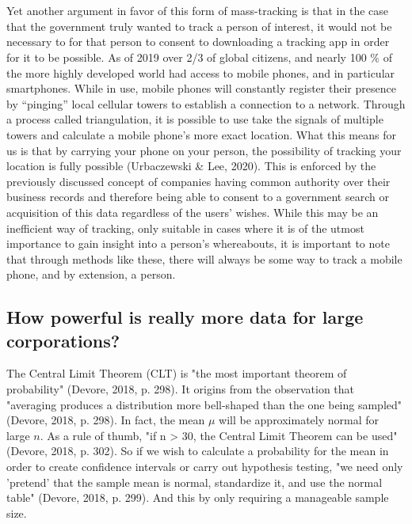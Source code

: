 \documentclass[11pt]{article}
\begin{document}
\\ \\
Yet another argument in favor of this form of mass-tracking is that in the case that the government truly wanted to track a person of interest, it would not be necessary to for that person to consent to downloading a tracking app in order for it to be possible.
As of 2019 over 2/3 of global citizens, and nearly 100 $\%$ of the more highly developed world had access to mobile phones, and in particular smartphones. While in use, mobile phones will constantly register their presence by “pinging” local cellular towers to establish a connection to a network. Through a process called triangulation, it is possible to use take the signals of multiple towers and calculate a mobile phone’s more exact location. What this means for us is that by carrying your phone on your person, the possibility of tracking your location is fully possible (Urbaczewski & Lee, 2020). This is enforced by the previously discussed concept of companies having common authority over their business records and therefore being able to consent to a government search or acquisition of this data regardless of the users’ wishes. 
While this may be an inefficient way of tracking, only suitable in cases where it is of the utmost importance to gain insight into a person’s whereabouts, it is important to note that through methods like these, there will always be some way to track a mobile phone, and by extension, a person.

\subsection{How powerful is really more data for large corporations?}
The Central Limit Theorem (CLT) is "the most important theorem of probability" (Devore, 2018, p. 298). It origins from the observation that "averaging produces a distribution more bell-shaped than the one being sampled" (Devore, 2018, p. 298). In fact, the mean $\mu$ will be approximately normal for large $n$. As a rule of thumb, "if n > 30, the Central Limit Theorem can be used" (Devore, 2018, p. 302). So if we wish to calculate a probability for the mean in order to create confidence intervals or carry out hypothesis testing, "we need only 'pretend' that the sample mean is normal, standardize it, and use the normal table" (Devore, 2018, p. 299). And this by only requiring a manageable sample size. \\ \\
\end{document}
